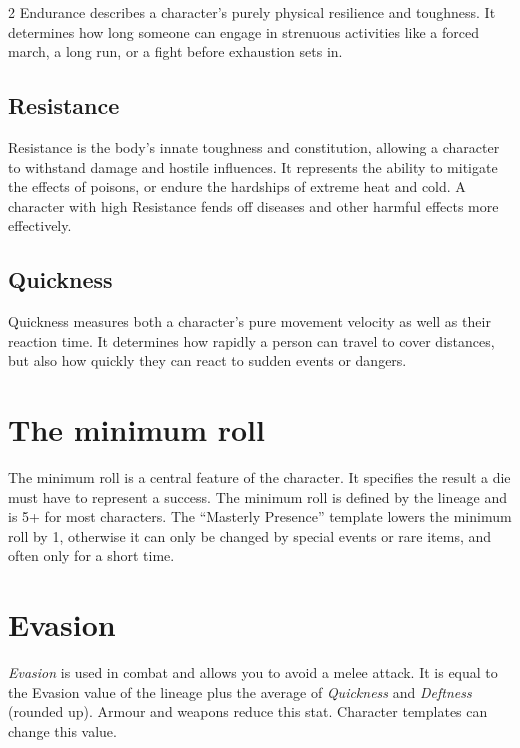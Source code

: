 \begin{multicols}{2}
Endurance describes a character's purely physical resilience and toughness. It determines how long someone can engage in strenuous activities like a forced march, a long run, or a fight before exhaustion sets in.

\subsection{Resistance}

Resistance is the body's innate toughness and constitution, allowing a character to withstand damage and hostile influences. It represents the ability to mitigate the effects of poisons, or endure the hardships of extreme heat and cold. A character with high Resistance fends off diseases and other harmful effects more effectively.

\subsection{Quickness}

Quickness measures both a character's pure movement velocity as well as their reaction time. It determines how rapidly a person can travel to cover distances, but also how quickly they can react to sudden events or dangers.

\section{The minimum roll}

The minimum roll is a central feature of the character. It specifies the result a die must have to represent a success. The minimum roll is defined by the lineage and is 5+ for most characters. The ``Masterly Presence'' template lowers the minimum roll by 1, otherwise it can only be changed by special events or rare items, and often only for a short time.

\section{Evasion}

\textit{Evasion} is used in combat and allows you to avoid a melee attack. It is equal to the Evasion value of the lineage plus the average of \textit{Quickness} and \textit{Deftness} (rounded up). Armour and weapons reduce this stat. Character templates can change this value.


\end{multicols}
